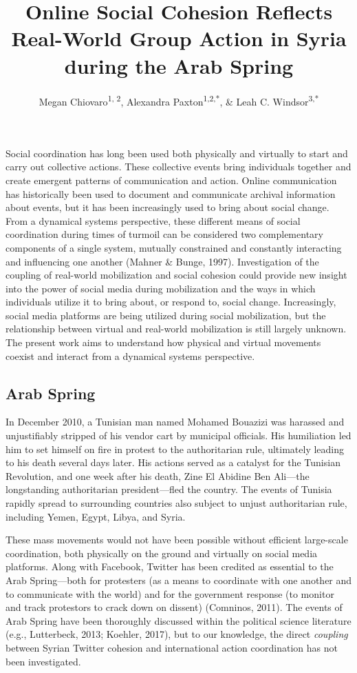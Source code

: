 \documentclass[english,man]{apa6}
\author{Megan Chiovaro\textsuperscript{1, 2}, Alexandra Paxton\textsuperscript{1,2,*}, \& Leah C. Windsor\textsuperscript{3,*}}
\affiliation{
\vspace{0.5cm}
\textsuperscript{1} Center for the Ecological Study of Perception and Action, University of Connecticut\\\textsuperscript{2} Department of Psychological Sciences, University of Connecticut\\\textsuperscript{3} University of Memphis\\\textsuperscript{*} Equal author contributions}
\title{Online Social Cohesion Reflects Real-World Group Action in Syria during the Arab Spring}
\date{}
\begin{document}
\maketitle

Social coordination has long been used both physically and virtually
to start and carry out collective actions. These collective events
bring individuals together and create emergent patterns of communication
and action. Online communication has historically been used to document
and communicate archival information about events, but it has been
increasingly used to bring about social change. From a dynamical
systems perspective, these different means of social coordination during
times of turmoil can be considered two complementary components of a
single system, mutually constrained and constantly interacting and
influencing one another (Mahner \& Bunge, 1997). Investigation of the
coupling of real-world mobilization and social cohesion could provide
new insight into the power of social media during mobilization and the
ways in which individuals utilize it to bring about, or respond to, social
change. Increasingly, social media platforms are being utilized during
social mobilization, but the relationship between virtual and real-world
mobilization is still largely unknown. The present work aims to understand
how physical and virtual movements coexist and interact from a dynamical
systems perspective.

\hypertarget{arab-spring}{%
\subsection{Arab Spring}\label{arab-spring}}

In December 2010, a Tunisian man named Mohamed Bouazizi was harassed and
unjustifiably stripped of his vendor cart by municipal officials. His
humiliation led him to set himself on fire in protest to the authoritarian
rule, ultimately leading to his death several days later. His actions served
as a catalyst for the Tunisian Revolution, and one week after his death,
Zine El Abidine Ben Ali---the longstanding authoritarian president---fled the
country. The events of Tunisia rapidly spread to surrounding countries
also subject to unjust authoritarian rule, including Yemen, Egypt, Libya,
and Syria.

These mass movements would not have been possible without
efficient large-scale coordination, both physically on the ground and virtually
on social media platforms. Along with Facebook, Twitter has been credited as
essential to the Arab Spring---both for protesters (as a means to coordinate
with one another and to communicate with the world) and for the government
response (to monitor and track protestors to crack down on dissent)
(Comninos, 2011). The events of Arab Spring have been thoroughly
discussed within the political science literature
(e.g., Lutterbeck, 2013; Koehler, 2017), but to our knowledge,
the direct \emph{coupling} between Syrian Twitter cohesion and international action
coordination has not been investigated.
\end{document}
